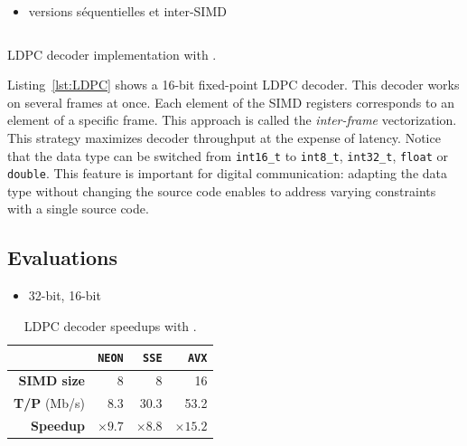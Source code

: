 \begin{itemize}
  \item versions séquentielles et inter-SIMD
\end{itemize}

\begin{listing}
  \inputminted[frame=lines,linenos]{C++}{main/chapter2/src/ldpc/bp_min_sum.cpp}
  \caption{LDPC decoder implementation with \MIPP.}
  \label{lst:LDPC}
\end{listing}

Listing~\ref{lst:LDPC} shows a 16-bit fixed-point LDPC decoder. This decoder
works on several frames at once. Each element of the SIMD registers corresponds
to an element of a specific frame. This approach is called the
\textit{inter-frame} vectorization. This strategy maximizes decoder throughput
at the expense of latency. Notice that the data type can be switched from
\verb|int16_t| to \verb|int8_t|, \verb|int32_t|, \verb|float| or \verb|double|.
This \MIPP feature is important for digital communication: adapting the data
type without changing the source code enables to address varying constraints
with a single source code.

\subsection{Evaluations}

\begin{itemize}
  \item 32-bit, 16-bit
\end{itemize}

\begin{table}
  \tabcolsep=6pt
  \centering
  \caption{LDPC decoder speedups with \MIPP.}
  \label{tab:ldpc_speedups}
  \begin{tabular}{r | r r r}
                      & \textbf{\texttt{NEON}} & \textbf{\texttt{SSE}} & \textbf{\texttt{AVX}} \\ \hline\hline
  \textbf{SIMD size}  & 8                      & 8                     & 16                    \\ %
  \textbf{T/P} (Mb/s) & 8.3                    & 30.3                  & 53.2                  \\ %
  \textbf{Speedup}    & $\times 9.7$           & $\times 8.8$          & $\times 15.2$         \\
  \end{tabular}
\end{table}

